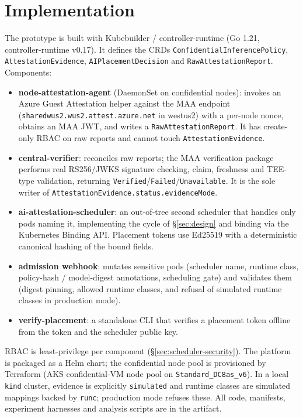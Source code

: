 \section{Implementation}
\label{sec:implementation}

The prototype is built with Kubebuilder / controller-runtime (Go 1.21,
controller-runtime v0.17). It defines the CRDs
\texttt{ConfidentialInferencePolicy}, \texttt{AttestationEvidence},
\texttt{AIPlacementDecision} and \texttt{RawAttestationReport}. Components:

\begin{itemize}
  \item \textbf{node-attestation-agent} (DaemonSet on confidential nodes): invokes
  an Azure Guest Attestation helper against the MAA endpoint
  (\texttt{sharedwus2.wus2.attest.azure.net} in westus2) with a per-node nonce,
  obtains an MAA JWT, and writes a \texttt{RawAttestationReport}. It has
  create-only RBAC on raw reports and cannot touch \texttt{AttestationEvidence}.
  \item \textbf{central-verifier}: reconciles raw reports; the MAA verification
  package performs real RS256/JWKS signature checking, claim, freshness and
  TEE-type validation, returning \texttt{Verified}/\texttt{Failed}/\texttt{Unavailable}.
  It is the sole writer of \texttt{AttestationEvidence.status.evidenceMode}.
  \item \textbf{ai-attestation-scheduler}: an out-of-tree second scheduler that
  handles only pods naming it, implementing the cycle of \S\ref{sec:design} and
  binding via the Kubernetes Binding API. Placement tokens use Ed25519 with a
  deterministic canonical hashing of the bound fields.
  \item \textbf{admission webhook}: mutates sensitive pods (scheduler name,
  runtime class, policy-hash / model-digest annotations, scheduling gate) and
  validates them (digest pinning, allowed runtime classes, and refusal of
  simulated runtime classes in production mode).
  \item \textbf{verify-placement}: a standalone CLI that verifies a placement
  token offline from the token and the scheduler public key.
\end{itemize}

RBAC is least-privilege per component (\S\ref{sec:scheduler-security}). The
platform is packaged as a Helm chart; the confidential node pool is provisioned
by Terraform (AKS confidential-VM node pool on \texttt{Standard\_DC8as\_v6}). In
a local \texttt{kind} cluster, evidence is explicitly \texttt{simulated} and
runtime classes are simulated mappings backed by \texttt{runc}; production mode
refuses these. All code, manifests, experiment harnesses and analysis scripts are
in the artifact.
